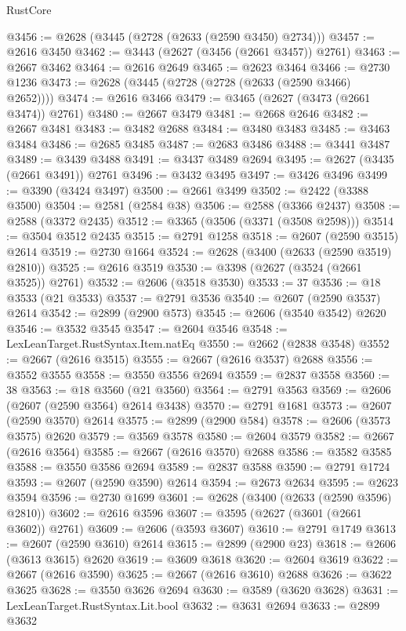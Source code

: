 \begin{lexlean}{RustCore}
\begin{coremodule}
@3456 := @2628 (@3445 (@2728 (@2633 (@2590 @3450) @2734)))
@3457 := @2616 @3450
@3462 := @3443 (@2627 (@3456 (@2661 @3457)) @2761)
@3463 := @2667 @3462
@3464 := @2616 @2649
@3465 := @2623 @3464
@3466 := @2730 @1236
@3473 := @2628 (@3445 (@2728 (@2728 (@2633 (@2590 @3466) @2652))))
@3474 := @2616 @3466
@3479 := @3465 (@2627 (@3473 (@2661 @3474)) @2761)
@3480 := @2667 @3479
@3481 := @2668 @2646
@3482 := @2667 @3481
@3483 := @3482 @2688
@3484 := @3480 @3483
@3485 := @3463 @3484
@3486 := @2685 @3485
@3487 := @2683 @3486
@3488 := @3441 @3487
@3489 := @3439 @3488
@3491 := @3437 @3489 @2694
@3495 := @2627 (@3435 (@2661 @3491)) @2761
@3496 := @3432 @3495
@3497 := @3426 @3496
@3499 := @3390 (@3424 @3497)
@3500 := @2661 @3499
@3502 := @2422 (@3388 @3500)
@3504 := @2581 (@2584 @38)
@3506 := @2588 (@3366 @2437)
@3508 := @2588 (@3372 @2435)
@3512 := @3365 (@3506 (@3371 (@3508 @2598)))
@3514 := @3504 @3512 @2435
@3515 := @2791 @1258
@3518 := @2607 (@2590 @3515) @2614
@3519 := @2730 @1664
@3524 := @2628 (@3400 (@2633 (@2590 @3519) @2810))
@3525 := @2616 @3519
@3530 := @3398 (@2627 (@3524 (@2661 @3525)) @2761)
@3532 := @2606 (@3518 @3530)
@3533 := 37
@3536 := @18 @3533 (@21 @3533)
@3537 := @2791 @3536
@3540 := @2607 (@2590 @3537) @2614
@3542 := @2899 (@2900 @573)
@3545 := @2606 (@3540 @3542) @2620
@3546 := @3532 @3545
@3547 := @2604 @3546
@3548 := LexLeanTarget.RustSyntax.Item.natEq
@3550 := @2662 (@2838 @3548)
@3552 := @2667 (@2616 @3515)
@3555 := @2667 (@2616 @3537) @2688
@3556 := @3552 @3555
@3558 := @3550 @3556 @2694
@3559 := @2837 @3558
@3560 := 38
@3563 := @18 @3560 (@21 @3560)
@3564 := @2791 @3563
@3569 := @2606 (@2607 (@2590 @3564) @2614 @3438)
@3570 := @2791 @1681
@3573 := @2607 (@2590 @3570) @2614
@3575 := @2899 (@2900 @584)
@3578 := @2606 (@3573 @3575) @2620
@3579 := @3569 @3578
@3580 := @2604 @3579
@3582 := @2667 (@2616 @3564)
@3585 := @2667 (@2616 @3570) @2688
@3586 := @3582 @3585
@3588 := @3550 @3586 @2694
@3589 := @2837 @3588
@3590 := @2791 @1724
@3593 := @2607 (@2590 @3590) @2614
@3594 := @2673 @2634
@3595 := @2623 @3594
@3596 := @2730 @1699
@3601 := @2628 (@3400 (@2633 (@2590 @3596) @2810))
@3602 := @2616 @3596
@3607 := @3595 (@2627 (@3601 (@2661 @3602)) @2761)
@3609 := @2606 (@3593 @3607)
@3610 := @2791 @1749
@3613 := @2607 (@2590 @3610) @2614
@3615 := @2899 (@2900 @23)
@3618 := @2606 (@3613 @3615) @2620
@3619 := @3609 @3618
@3620 := @2604 @3619
@3622 := @2667 (@2616 @3590)
@3625 := @2667 (@2616 @3610) @2688
@3626 := @3622 @3625
@3628 := @3550 @3626 @2694
@3630 := @3589 (@3620 @3628)
@3631 := LexLeanTarget.RustSyntax.Lit.bool
@3632 := @3631 @2694
@3633 := @2899 @3632

\end{coremodule}
\end{lexlean}
